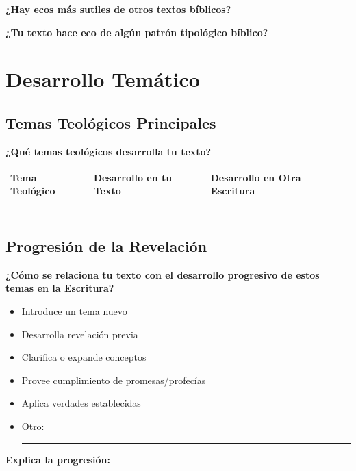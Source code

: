 \documentclass[11pt,a4paper]{article}
\begin{document}
\textbf{¿Hay ecos más sutiles de otros textos bíblicos?}
\vspace{2cm}

\textbf{¿Tu texto hace eco de algún patrón tipológico bíblico?}
\vspace{2cm}

\newpage

\section{Desarrollo Temático}

\subsection{Temas Teológicos Principales}

\textbf{¿Qué temas teológicos desarrolla tu texto?}

\begin{tabularx}{\textwidth}{|X|X|X|}
\hline
\textbf{Tema Teológico} & \textbf{Desarrollo en tu Texto} & \textbf{Desarrollo en Otra Escritura} \\
\hline
& & \\[1.5cm]
\hline
& & \\[1.5cm]
\hline
& & \\[1.5cm]
\hline
& & \\[1.5cm]
\hline
\end{tabularx}

\subsection{Progresión de la Revelación}

\textbf{¿Cómo se relaciona tu texto con el desarrollo progresivo de estos temas en la Escritura?}

\begin{itemize}[leftmargin=1cm]
    \item[$\square$] Introduce un tema nuevo
    \item[$\square$] Desarrolla revelación previa
    \item[$\square$] Clarifica o expande conceptos
    \item[$\square$] Provee cumplimiento de promesas/profecías
    \item[$\square$] Aplica verdades establecidas
    \item[$\square$] Otro: \rule{6cm}{0.4pt}
\end{itemize}

\textbf{Explica la progresión:}
\vspace{3cm}
\end{document}
